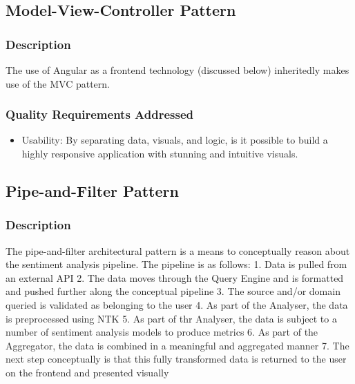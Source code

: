 \documentclass[12pt]{article}
\begin{document}
\subsection{Model-View-Controller Pattern}
\subsubsection{Description}
The use of Angular as a frontend technology (discussed below) inheritedly makes use of the MVC pattern.
\subsubsection{Quality Requirements Addressed}
\begin{itemize}
    \item Usability: By separating data, visuals, and logic, is it possible to build a highly responsive application with stunning and intuitive visuals.
\end{itemize}
\subsection{Pipe-and-Filter Pattern}
\subsubsection{Description}
The pipe-and-filter architectural pattern is a means to conceptually reason about the sentiment analysis pipeline. The pipeline is as follows: 1. Data is pulled from an external API 2. The data moves through the Query Engine and is formatted and pushed further along the conceptual pipeline 3. The source and/or domain queried is validated as belonging to the user 4. As part of the Analyser, the data is preprocessed using NTK 5. As part of thr Analyser, the data is subject to a number of sentiment analysis models to produce metrics 6. As part of the Aggregator, the data is combined in a meaningful and aggregated manner 7. The next step conceptually is that this fully transformed data is returned to the user on the frontend and presented visually
\end{document}
